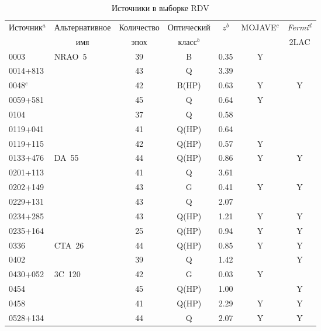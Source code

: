 \begin{table}
\tiny
\caption{Источники в выборке RDV}
\label{tab:rdv_sources}
\centering
\begin{SingleSpace}
\begin{tabular}{l l c c c c c}
\toprule
\multicolumn{1}{c}{Источник$^{a}$} & \multicolumn{1}{c}{Альтернативное} & Количество & Оптический &
$z^{b}$ & MOJAVE$^{c}$ & \emph{Fermi}$^{d}$ \\
 & \multicolumn{1}{c}{имя} & эпох & класс$^{b}$ & &  & 2LAC \\
\midrule
0003\textminus066       & NRAO~5    & 39 & B     & 0.35      & Y &   \\
0014+813         &           & 43 & Q     & 3.39      &   &   \\
0048\textminus097$^{e}$ &           & 42 & B(HP) & 0.63      & Y & Y \\
0059+581         &           & 45 & Q     & 0.64      & Y &   \\
0104\textminus408       &           & 37 & Q     & 0.58      &   &   \\
0119+041         &           & 41 & Q(HP) & 0.64      &   &   \\
0119+115         &           & 42 & Q(HP) & 0.57      & Y &   \\
0133+476         & DA~55     & 44 & Q(HP) & 0.86      & Y & Y \\
0201+113         &           & 41 & Q     & 3.61      &   &   \\
0202+149         &           & 43 & G     & 0.41      & Y & Y \\
0229+131         &           & 43 & Q     & 2.07      &   &   \\
0234+285         &           & 43 & Q(HP) & 1.21      & Y & Y \\
0235+164         &           & 25 & Q(HP) & 0.94      & Y & Y \\
0336\textminus019       & CTA~26    & 44 & Q(HP) & 0.85      & Y & Y \\
0402\textminus362       &           & 39 & Q     & 1.42      &   & Y \\
0430+052         & 3C~120    & 42 & G     & 0.03      & Y &   \\
0454\textminus234       &           & 45 & Q(HP) & 1.00      &   & Y \\
0458\textminus020       &           & 41 & Q(HP) & 2.29      & Y & Y \\
0528+134         &           & 44 & Q     & 2.07      & Y & Y \\

\end{tabular}
\end{SingleSpace}
\end{table}
